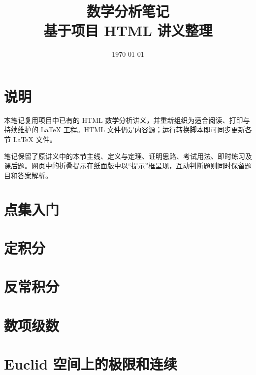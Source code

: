 \documentclass[11pt,openany]{ctexbook}
\title{数学分析笔记\\\large 基于项目 HTML 讲义整理}
\author{}
\date{\today}
\begin{document}
\frontmatter
\maketitle

\chapter*{说明}
本笔记复用项目中已有的 HTML 数学分析讲义，并重新组织为适合阅读、打印与持续维护的 LaTeX 工程。HTML 文件仍是内容源；运行转换脚本即可同步更新各节 LaTeX 文件。

笔记保留了原讲义中的本节主线、定义与定理、证明思路、考试用法、即时练习及课后题。网页中的折叠提示在纸面版中以“提示”框呈现，互动判断题则同时保留题目和答案解析。

\tableofcontents

\mainmatter
\chapter*{点集入门}
\renewcommand{\thesection}{\arabic{section}}


\renewcommand{\thesection}{\thechapter.\arabic{section}}

\setcounter{chapter}{6}
\chapter{定积分}
\setcounter{section}{1}




\chapter{反常积分}



\chapter{数项级数}






\setcounter{chapter}{10}
\chapter{Euclid 空间上的极限和连续}



\end{document}
